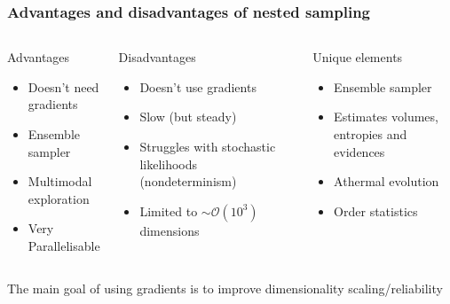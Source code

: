 \documentclass[aspectratio=169]{beamer}
\begin{document}
\begin{frame}
    \frametitle{Advantages and disadvantages of nested sampling}
    \begin{columns}[t]
        \begin{exampleblock}{Advantages}
            \begin{itemize}
                \item Doesn't need gradients
                \item Ensemble sampler
                \item Multimodal exploration
                \item Very Parallelisable
            \end{itemize}
        \end{exampleblock}
        \begin{alertblock}{Disadvantages}
            \begin{itemize}
                \item Doesn't use gradients
                \item Slow (but steady)
                \item Struggles with stochastic likelihoods (nondeterminism)
                \item Limited to $\sim\mathcal{O}(10^3)$ dimensions
            \end{itemize}
        \end{alertblock}
        \begin{block}{Unique elements}
            \begin{itemize}
                \item Ensemble sampler
                \item Estimates volumes, entropies and evidences
                \item Athermal evolution
                \item Order statistics
            \end{itemize}
        \end{block}
    \end{columns}
    \vspace{10pt}
    The main goal of using gradients is to improve dimensionality scaling/reliability
\end{frame}
\end{document}
